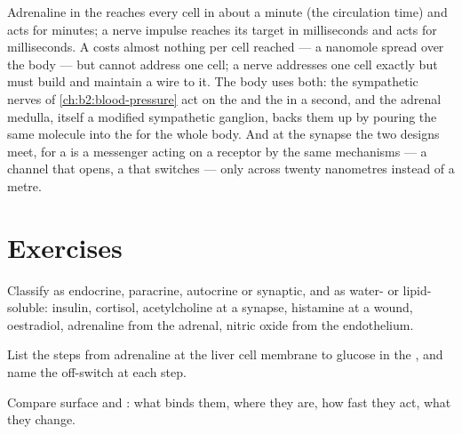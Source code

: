 \begin{example}\label{ex:b2:cell-signalling:compare}
Adrenaline in the  reaches every cell in about a minute
(the circulation time) and acts for minutes; a nerve impulse
reaches its target in milliseconds and acts for milliseconds. A
 costs almost nothing per cell reached --- a nanomole spread
over the body --- but cannot address one cell; a nerve addresses one
cell exactly but must build and maintain a wire to it. The body uses
both: the sympathetic nerves of \cref{ch:b2:blood-pressure} act on
the  and the  in a second, and the adrenal medulla,
itself a modified sympathetic ganglion, backs them up by pouring the
same molecule into the  for the whole body. And at the synapse
the two designs meet, for a  is a messenger acting
on a receptor by the same mechanisms --- a channel that opens, a  that switches --- only across twenty nanometres instead of a
metre.
\end{example}

\section{Exercises}

\begin{exercise}[$\star$]\label{exo:b2:cell-signalling:1}
Classify as endocrine, paracrine, autocrine or synaptic, and as
water- or lipid-soluble: insulin, cortisol, acetylcholine at a
synapse, histamine at a wound, oestradiol, adrenaline from the
adrenal, nitric oxide from the endothelium.
\end{exercise}

\begin{exercise}[$\star$]\label{exo:b2:cell-signalling:2}
List the steps from adrenaline at the liver cell membrane to glucose
in the , and name the off-switch at each step.
\end{exercise}

\begin{exercise}[$\star$]\label{exo:b2:cell-signalling:3}
Compare surface and : what binds them, where they
are, how fast they act, what they change.
\end{exercise}

